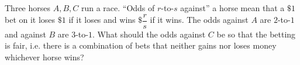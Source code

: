 Three horses $A,B,C$ run a race. ``Odds of $r$-to-$s$ against'' a horse mean that a $\$1$ bet on it loses $\$1$ if it loses and wins $\$\dfrac rs$ if it wins. The odds against $A$ are $2$-to-$1$ and against $B$ are $3$-to-$1$. What should the odds against $C$ be so that the betting is fair, i.e. there is a combination of bets that neither gains nor loses money whichever horse wins?
